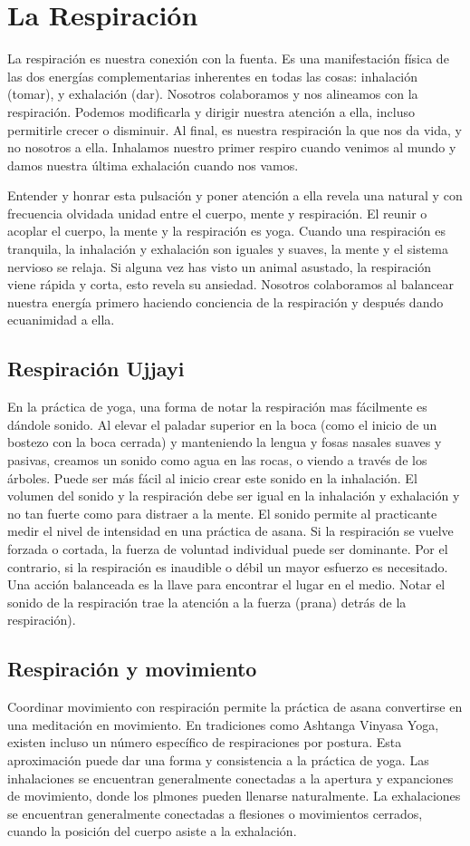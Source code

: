 \section{La Respiración}
La respiración es nuestra conexión con la fuenta. Es una manifestación física de las dos energías complementarias inherentes en todas las cosas: inhalación (tomar), y exhalación (dar). Nosotros colaboramos y nos alineamos con la respiración. Podemos modificarla y dirigir nuestra atención a ella, incluso permitirle crecer o disminuir. Al final, es nuestra respiración la que nos da vida, y no nosotros a ella. Inhalamos nuestro primer respiro cuando venimos al mundo y damos nuestra última exhalación cuando nos vamos.

Entender y honrar esta pulsación y poner atención a ella revela una natural y con frecuencia olvidada unidad entre el cuerpo, mente y respiración. El reunir o acoplar el cuerpo, la mente y la respiración es yoga. Cuando una respiración es tranquila, la inhalación y exhalación son iguales y suaves, la mente y el sistema nervioso se relaja. Si alguna vez has visto un animal asustado, la respiración viene rápida y corta, esto revela su ansiedad. Nosotros colaboramos al balancear nuestra energía primero haciendo conciencia de la respiración y despu\'es dando ecuanimidad a ella.

\subsection{Respiración Ujjayi}
En la práctica de yoga, una forma de notar la respiración mas fácilmente es dándole sonido. Al elevar el paladar superior en la boca (como el inicio de un bostezo con la boca cerrada) y manteniendo la lengua y fosas nasales suaves y pasivas, creamos un sonido como agua en las rocas, o viendo a trav\'es de los árboles. Puede ser más fácil al inicio crear este sonido en la inhalación. El volumen del sonido y la respiración debe ser igual en la inhalación y exhalación y no tan fuerte como para distraer a la mente. El sonido permite al practicante medir el nivel de intensidad en una práctica de asana. Si la respiración se vuelve forzada o cortada, la fuerza de voluntad individual puede ser dominante. Por el contrario, si la respiración es inaudible o d\'ebil un mayor esfuerzo es necesitado. Una acción balanceada es la llave para encontrar el lugar en el medio. Notar el sonido de la respiración trae la atención a la fuerza (prana) detrás de la respiración).

\subsection{Respiración y movimiento}
Coordinar movimiento con respiración permite la práctica de asana convertirse en una meditación en movimiento. En tradiciones como Ashtanga Vinyasa Yoga, existen incluso un número específico de respiraciones por postura. Esta aproximación puede dar una forma y consistencia a la práctica de yoga. Las inhalaciones se encuentran generalmente conectadas a la apertura y expanciones de movimiento, donde los plmones pueden llenarse naturalmente. La exhalaciones se encuentran generalmente conectadas a flesiones o movimientos cerrados, cuando la posición del cuerpo asiste a la exhalación.

